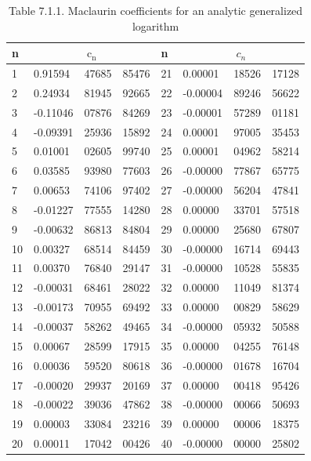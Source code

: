 \documentclass[10pt]{article}
\begin{document}
\begin{table}[h]
\begin{center}
\captionsetup{labelformat=empty}
\caption{Table 7.1.1. Maclaurin coefficients for an analytic generalized logarithm}
\begin{tabular}{|l|l|l|l|l|l|l|l|}
\hline
n & \multicolumn{3}{|c|}{$\mathrm{c}_{\mathrm{n}}$} & n & \multicolumn{3}{|c|}{$c_{n}$} \\
\hline
1 & 0.91594 & 47685 & 85476 & 21 & 0.00001 & 18526 & 17128 \\
\hline
2 & 0.24934 & 81945 & 92665 & 22 & -0.00004 & 89246 & 56622 \\
\hline
3 & -0.11046 & 07876 & 84269 & 23 & -0.00001 & 57289 & 01181 \\
\hline
4 & -0.09391 & 25936 & 15892 & 24 & 0.00001 & 97005 & 35453 \\
\hline
5 & 0.01001 & 02605 & 99740 & 25 & 0.00001 & 04962 & 58214 \\
\hline
6 & 0.03585 & 93980 & 77603 & 26 & -0.00000 & 77867 & 65775 \\
\hline
7 & 0.00653 & 74106 & 97402 & 27 & -0.00000 & 56204 & 47841 \\
\hline
8 & -0.01227 & 77555 & 14280 & 28 & 0.00000 & 33701 & 57518 \\
\hline
9 & -0.00632 & 86813 & 84804 & 29 & 0.00000 & 25680 & 67807 \\
\hline
10 & 0.00327 & 68514 & 84459 & 30 & -0.00000 & 16714 & 69443 \\
\hline
11 & 0.00370 & 76840 & 29147 & 31 & -0.00000 & 10528 & 55835 \\
\hline
12 & -0.00031 & 68461 & 28022 & 32 & 0.00000 & 11049 & 81374 \\
\hline
13 & -0.00173 & 70955 & 69492 & 33 & 0.00000 & 00829 & 58629 \\
\hline
14 & -0.00037 & 58262 & 49465 & 34 & -0.00000 & 05932 & 50588 \\
\hline
15 & 0.00067 & 28599 & 17915 & 35 & 0.00000 & 04255 & 76148 \\
\hline
16 & 0.00036 & 59520 & 80618 & 36 & -0.00000 & 01678 & 16704 \\
\hline
17 & -0.00020 & 29937 & 20169 & 37 & 0.00000 & 00418 & 95426 \\
\hline
18 & -0.00022 & 39036 & 47862 & 38 & -0.00000 & 00066 & 50693 \\
\hline
19 & 0.00003 & 33084 & 23216 & 39 & 0.00000 & 00006 & 18375 \\
\hline
20 & 0.00011 & 17042 & 00426 & 40 & -0.00000 & 00000 & 25802 \\
\hline
\end{tabular}
\end{center}
\end{table}
\end{document}
